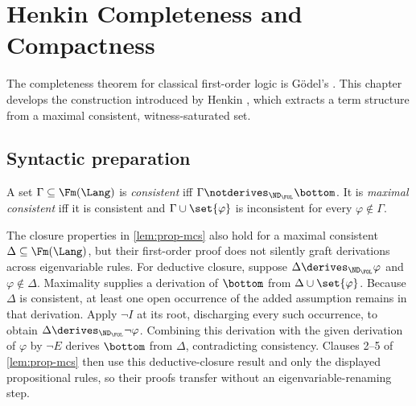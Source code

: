 \chapter{Henkin Completeness and Compactness}
\label{ch:fol-metatheory}

The completeness theorem for classical first-order logic is G\"odel's
\cite{Godel1930}.  This chapter develops the construction introduced by
Henkin \cite{Henkin1949}, which extracts a term structure from a maximal
consistent, witness-saturated set.

\section{Syntactic preparation}
\label{sec:fol-metatheory-01}

\begin{definition}
A set \(\Gamma\subseteq\Fm(\Lang)\) is \emph{consistent} iff
\(\Gamma\notderives_{\ND_{\FOL}}\bottom\).  It is \emph{maximal consistent}
iff it is consistent and \(\Gamma\cup\set{\varphi}\) is inconsistent for
every \(\varphi\notin\Gamma\).
\end{definition}

The closure properties in \cref{lem:prop-mcs} also hold for a maximal
consistent \(\Delta\subseteq\Fm(\Lang)\), but their first-order proof does not
silently graft derivations across eigenvariable rules.  For deductive closure,
suppose \(\Delta\derives_{\ND_{\FOL}}\varphi\) and
\(\varphi\notin\Delta\).  Maximality supplies a derivation of \(\bottom\) from
\(\Delta\cup\set{\varphi}\).  Because \(\Delta\) is consistent, at least one
open occurrence of the added assumption remains in that derivation.  Apply
\(\neg I\) at its root, discharging every such occurrence, to obtain
\(\Delta\derives_{\ND_{\FOL}}\neg\varphi\).  Combining this derivation with
the given derivation of \(\varphi\) by \(\neg E\) derives \(\bottom\) from
\(\Delta\), contradicting consistency.  Clauses 2--5 of
\cref{lem:prop-mcs} then use this deductive-closure result and only the
displayed propositional rules, so their proofs transfer without an
eigenvariable-renaming step.


